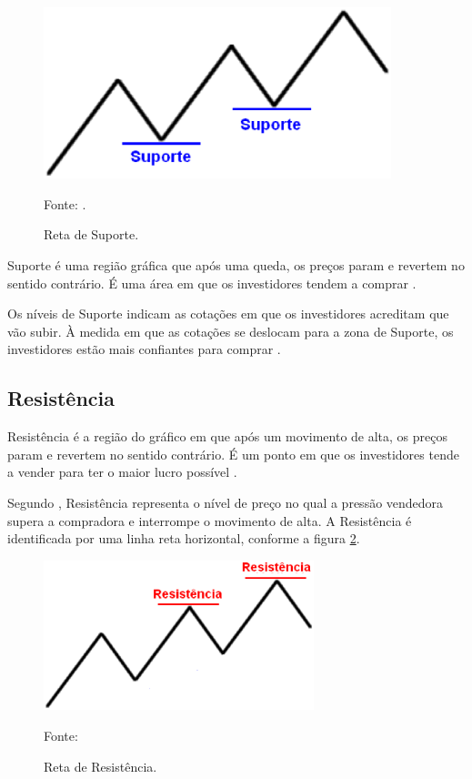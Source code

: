 \begin{figure}[htp]
\centering
\includegraphics[width=0.9\textwidth]{figuras/retaSuporte}
\caption{Reta de Suporte.}{Fonte: .}
\label{retaSuporte}
\end{figure}

Suporte é uma região gráfica que após uma queda, os preços param e revertem no sentido contrário. É uma área em que os investidores tendem a comprar \cite[p~97]{debastini2008}.

Os níveis de Suporte indicam as cotações em que os investidores acreditam que vão subir. À medida em que as cotações se deslocam para a zona de Suporte, os investidores estão mais confiantes para comprar \cite{collins2012}.

\subsection{Resistência}

Resistência é a região do gráfico em que após um movimento de alta, os preços param e revertem no sentido contrário. É um ponto em que os investidores tende a vender para ter o maior lucro possível \cite[pág.~98]{debastini2008}.

Segundo , Resistência representa o nível de preço no qual a pressão vendedora supera a compradora e interrompe o movimento de alta. A Resistência é identificada por uma linha reta horizontal, conforme a figura \ref{retaResistencia}.

\begin{figure}[htp]
\centering
\includegraphics[width=0.7\textwidth]{figuras/retaResistencia}
\caption{Reta de Resistência.}{Fonte: } 
\label{retaResistencia}
\end{figure}

